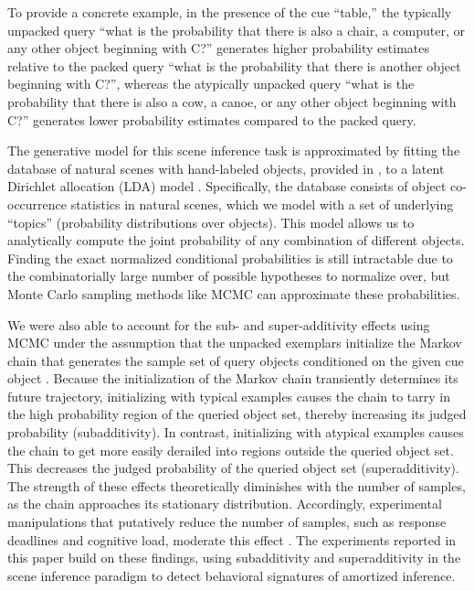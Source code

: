 To provide a concrete example, in the presence of the cue ``table,'' the typically unpacked query ``what is the probability that there is also a chair, a computer, or any other object beginning with C?'' generates higher probability estimates relative to the packed query ``what is the probability that there is another object beginning with C?'', whereas the atypically unpacked query ``what is the probability that there is also a cow, a canoe, or any other object beginning with C?'' generates lower probability estimates compared to the packed query.


The generative model for this scene inference task is approximated by fitting the database of natural scenes with hand-labeled objects, provided in \citet{greene13}, to a latent Dirichlet allocation (LDA) model \citep{lda}. Specifically, the database consists of object co-occurrence statistics in natural scenes, which we model with a set of underlying ``topics'' (probability distributions over objects). This model allows us to analytically compute the joint probability of any combination of different objects. Finding the exact normalized conditional probabilities is still intractable due to the combinatorially large number of possible hypotheses to normalize over, but Monte Carlo sampling methods like MCMC can approximate these probabilities.



We were also able to account for the sub- and super-additivity effects using MCMC under the assumption that the unpacked exemplars initialize the Markov chain that generates the sample set of query objects conditioned on the given cue object \citep{dasgupta17}. 
Because the initialization of the Markov chain transiently determines its future trajectory, initializing with typical examples causes the chain to tarry in the high probability region of the queried object set, thereby increasing its judged probability (subadditivity). In contrast, initializing with atypical examples causes the chain to get more easily derailed into regions outside the queried object set. This decreases the judged probability of the queried object set (superadditivity). The strength of these effects theoretically diminishes with the number of samples, as the chain approaches its stationary distribution. Accordingly, experimental manipulations that putatively reduce the number of samples, such as response deadlines and cognitive load, moderate this effect \citep{dasgupta17}. The experiments reported in this paper build on these findings, using subadditivity and superadditivity in the scene inference paradigm to detect behavioral signatures of amortized inference.


